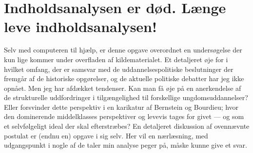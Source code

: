 \section{Indholdsanalysen er død. Længe leve indholdsanalysen!}
Selv med computeren til hjælp, er denne opgave overordnet en undersøgelse der kun lige kommer under overfladen af kildematerialet.
Et detaljeret øje for i hvilket omfang, 
der er samsvar med de uddannelsespolitiske beslutninger der fremgår af de historiske opgørelser,
og de aktuelle politiske debatter har jeg ikke opnået.
Men jeg har afdækket tendenser.
Kan man få øje på en anerkendelse af de strukturelle uddfordringer i tilgængelighed til forskellige ungdomsuddannelser?
Eller forsvinder dette perspektiv i en karikatur af Bernstein og Bourdieu; hvor den dominerende middelklasses perspektiver og levevis tages for givet — og som et selvfølgeligt ideal der skal efterstræbes?
En detaljeret diskussion af ovennævnte postulat er (endnu en) opgave i sig selv.
Her vil en nærlæsning, med udgangspunkt i nogle af de taler min analyse peger på, måske kunne give et svar.

